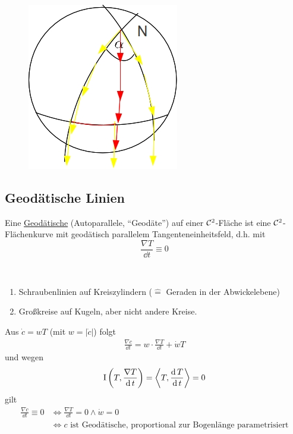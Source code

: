 \begin{bsp}
\begin{figure}[ht]
 \centering
\includegraphics[scale=0.3]{Bilder/Bsp13}
\end{figure}
\end{bsp}

\subsection{Geodätische Linien}
\begin{definition}
 Eine \uline{Geodätische} (Autoparallele, "`Geodäte"') auf einer \(\mathcal{C}^2\)-Fläche ist eine \(\mathcal{C}^2\)-Flächenkurve mit geodätisch parallelem Tangenteneinheitsfeld, d.h. mit
 \[
  \boxed{\frac{\nabla T}{\dd t} \equiv 0}
 \]
\end{definition}
\begin{bsp} \(\)
 \begin{enumerate}
  \item Schraubenlinien auf Kreiszylindern (\(\widehat{=}\) Geraden in der Abwickelebene)
  \item Großkreise auf Kugeln, aber nicht andere Kreise.
 \end{enumerate}
\end{bsp}
Aus \(\dot c = w T\) (mit \(w = |\dot c|\)) folgt 
\begin{align*}
 \frac{\nabla \dot c}{\dd t} = w \cdot \frac{\nabla T}{\dd t} + \dot w T
\end{align*}
und wegen 
\[ 
\Rom 1 \left(T, \frac{\nabla T}{\dd t}\right) = \left\langle T, \frac{\dd T}{\dd t} \right\rangle = 0
\]
gilt
 \begin{align*}
  \frac{\nabla \dot c}{\dd t} \equiv 0 &\Leftrightarrow \frac{\nabla T}{\dd t} = 0 \land \dot w = 0 \\
  &\Leftrightarrow c \text{ ist Geodätische, proportional zur Bogenlänge parametrisiert}
 \end{align*}

